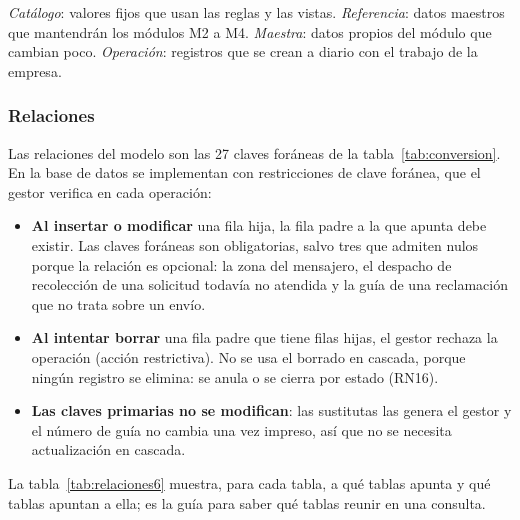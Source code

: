 \textit{Catálogo}: valores fijos que usan las reglas y las vistas.
\textit{Referencia}: datos maestros que mantendrán los módulos M2 a M4.
\textit{Maestra}: datos propios del módulo que cambian poco.
\textit{Operación}: registros que se crean a diario con el trabajo de la
empresa.

\subsubsection{Relaciones}

Las relaciones del modelo son las 27 claves foráneas de la
tabla~\ref{tab:conversion}. En la base de datos se implementan con
restricciones de clave foránea, que el gestor verifica en cada
operación:

\begin{itemize}[itemsep=2pt]
  \item \textbf{Al insertar o modificar} una fila hija, la fila padre a
        la que apunta debe existir. Las claves foráneas son obligatorias,
        salvo tres que admiten nulos porque la relación es opcional: la
        zona del mensajero, el despacho de recolección de una solicitud
        todavía no atendida y la guía de una reclamación que no trata
        sobre un envío.
  \item \textbf{Al intentar borrar} una fila padre que tiene filas
        hijas, el gestor rechaza la operación (acción restrictiva). No se
        usa el borrado en cascada, porque ningún registro se elimina: se
        anula o se cierra por estado (RN16).
  \item \textbf{Las claves primarias no se modifican}: las sustitutas
        las genera el gestor y el número de guía no cambia una vez
        impreso, así que no se necesita actualización en cascada.
\end{itemize}

La tabla~\ref{tab:relaciones6} muestra, para cada tabla, a qué tablas
apunta y qué tablas apuntan a ella; es la guía para saber qué tablas
reunir en una consulta.

